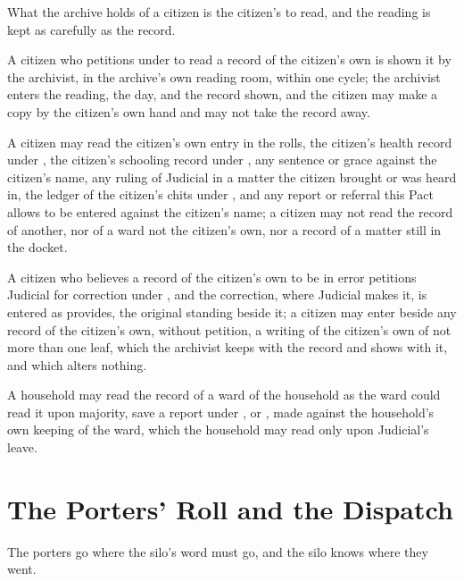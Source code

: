 What the archive holds of a citizen is the citizen's to read, and the reading is kept as carefully as the record.

\begin{clauses}
\item A citizen who petitions under  to read a record of the citizen's own is shown it by the archivist, in the archive's own reading room, within one cycle; the archivist enters the reading, the day, and the record shown, and the citizen may make a copy by the citizen's own hand and may not take the record away.
\item A citizen may read the citizen's own entry in the rolls, the citizen's health record under , the citizen's schooling record under , any sentence or grace against the citizen's name, any ruling of Judicial in a matter the citizen brought or was heard in, the ledger of the citizen's chits under , and any report or referral this Pact allows to be entered against the citizen's name; a citizen may not read the record of another, nor of a ward not the citizen's own, nor a record of a matter still in the docket.
\item A citizen who believes a record of the citizen's own to be in error petitions Judicial for correction under , and the correction, where Judicial makes it, is entered as  provides, the original standing beside it; a citizen may enter beside any record of the citizen's own, without petition, a writing of the citizen's own of not more than one leaf, which the archivist keeps with the record and shows with it, and which alters nothing.
\item A household may read the record of a ward of the household as the ward could read it upon majority, save a report under , or , made against the household's own keeping of the ward, which the household may read only upon Judicial's leave.
\end{clauses}

\section{The Porters' Roll and the Dispatch}
\label{sec:records:porters-roll-and-the-dispatch}

The porters go where the silo's word must go, and the silo knows where they went.

